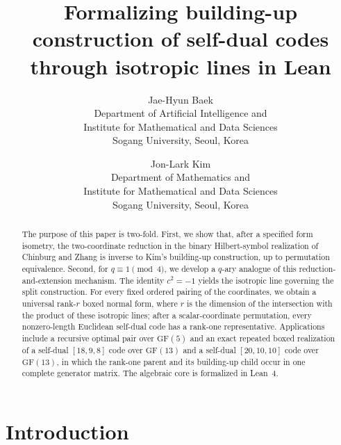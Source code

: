 \documentclass[12pt]{article}
\newcommand{\GF}[1]{\ensuremath{\mathrm{GF}(#1)}}
\begin{document}
\title{Formalizing building-up construction of self-dual codes through isotropic lines in Lean}

\author{
Jae-Hyun Baek \\
Department of Artificial Intelligence and \\
Institute for Mathematical and Data Sciences \\
Sogang University, Seoul, Korea
\and
Jon-Lark Kim\\
Department of Mathematics and\\
Institute for Mathematical and Data Sciences \\
Sogang University, Seoul, Korea
}

\maketitle

\begin{abstract}
The purpose of this paper is two-fold. First, we show that, after a specified
form isometry, the two-coordinate reduction in the binary Hilbert-symbol
realization of Chinburg and Zhang is inverse to Kim's building-up construction,
up to permutation equivalence. Second,
for \(q\equiv1\pmod4\), we develop a \(q\)-ary analogue of this
reduction-and-extension mechanism. The identity \(c^2=-1\) yields the
isotropic line governing the split construction.  For every fixed ordered
pairing of the coordinates, we obtain a universal rank-\(r\) boxed normal
form, where \(r\) is the dimension of the intersection with the product of
these isotropic lines; after a scalar-coordinate permutation, every
nonzero-length Euclidean self-dual code has a rank-one representative.
Applications include a recursive optimal pair over \(\GF{5}\) and an exact
repeated boxed realization of a self-dual \([18,9,8]\) code over \(\GF{13}\)
and a self-dual \([20,10,10]\) code over \(\GF{13}\), in which the rank-one
parent and its building-up child occur in one complete generator matrix.
The algebraic core is formalized in Lean~4.
\end{abstract}




\section{Introduction}
\label{sec:intro}
\end{document}
